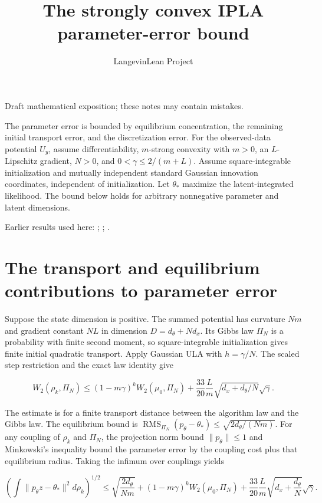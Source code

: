 \documentclass[11pt,a4paper]{article}
\title{\texorpdfstring{The strongly convex IPLA parameter-error bound}{The strongly convex IPLA parameter-error bound}}
\author{LangevinLean Project}
\date{}
\begin{document}
\maketitle
Draft mathematical exposition; these notes may contain mistakes.


The parameter error is bounded by equilibrium concentration, the remaining initial transport error, and the discretization error. For the observed-data potential \(U_y\), assume differentiability, \(m\)-strong convexity with \(m>0\), an \(L\)-Lipschitz gradient, \(N>0\), and \(0<\gamma\le2/(m+L)\). Assume square-integrable initialization and mutually independent standard Gaussian innovation coordinates, independent of initialization. Let \(\theta_*\) maximize the latent-integrated likelihood. The bound below holds for arbitrary nonnegative parameter and latent dimensions.



Earlier results used here: \cite[Section~3.50]{LangevinLean2026ULASC}; \cite[Section~3.52]{LangevinLean2026ULASC}; \cite[Section~3.53]{LangevinLean2026ULASC}.

\section{\texorpdfstring{The transport and equilibrium contributions to parameter error}{The transport and equilibrium contributions to parameter error}}


Suppose the state dimension is positive. The summed potential has curvature \(Nm\) and gradient constant \(NL\) in dimension \(D=d_\theta+Nd_x\). Its Gibbs law \(\Pi_N\) is a probability with finite second moment, so square-integrable initialization gives finite initial quadratic transport. Apply Gaussian ULA with \(h=\gamma/N\). The scaled step restriction and the exact law identity give

\[W_2(\rho_k,\Pi_N)\le(1-m\gamma)^kW_2(\mu_0,\Pi_N)+\frac{33}{20}\frac Lm\sqrt{d_x+d_\theta/N}\sqrt\gamma.\]

The estimate is for a finite transport distance between the algorithm law and the Gibbs law. The equilibrium bound is \(\operatorname{RMS}_{\Pi_N}(p_\theta-\theta_*)\le\sqrt{2d_\theta/(Nm)}\). For any coupling of \(\rho_k\) and \(\Pi_N\), the projection norm bound \(\|p_\theta\|\le1\) and Minkowski’s inequality bound the parameter error by the coupling cost plus that equilibrium radius. Taking the infimum over couplings yields

\[\left(\int\|p_\theta z-\theta_*\|^2d\rho_k\right)^{1/2}\le\sqrt{\frac{2d_\theta}{Nm}}+(1-m\gamma)^kW_2(\mu_0,\Pi_N)+\frac{33}{20}\frac Lm\sqrt{d_x+\frac{d_\theta}{N}}\sqrt\gamma.\]
\end{document}
